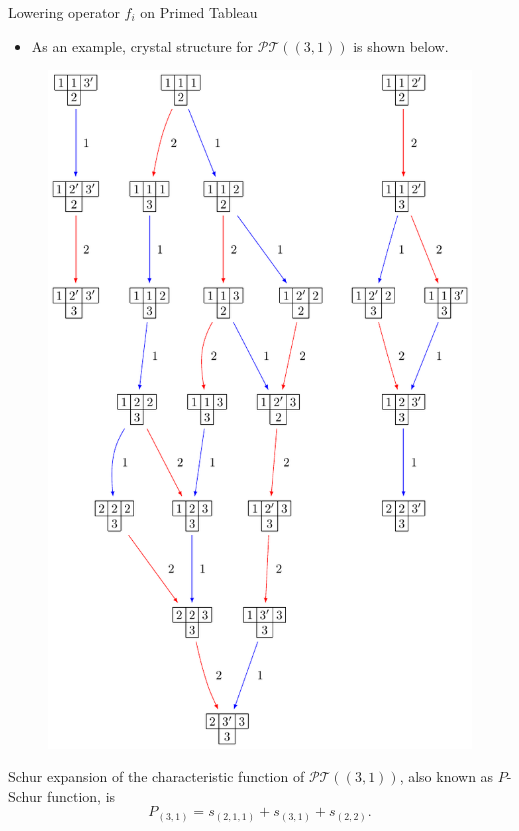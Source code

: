 \documentclass[final]{beamer}
\theoremstyle{definition}
\numberwithin{equation}{section}
\newlength{\onecolwid}
\begin{document}
\begin{frame}[t]
\begin{columns}[t]
\begin{column}{\onecolwid}
\begin{block}{Lowering operator $f_i$ on Primed Tableau}
\begin{itemize}
\item As an example, crystal structure for $\mathcal{PT} ((3,1))$ is shown below.
\end{itemize}


\begin{figure}
\includegraphics[scale=1.6]{Crystal_Shifted}
\centering
\end{figure}

 Schur expansion of the characteristic function of $\mathcal{PT} ((3,1))$, also known as $P$-Schur function, is
 \begin{equation*}
 P_{(3,1)} = s_{(2,1,1)} + s_{(3,1)} + s_{(2,2)}.
 \end{equation*}
 

\end{block}
\end{column}
\end{columns}
\end{frame}
\end{document}
